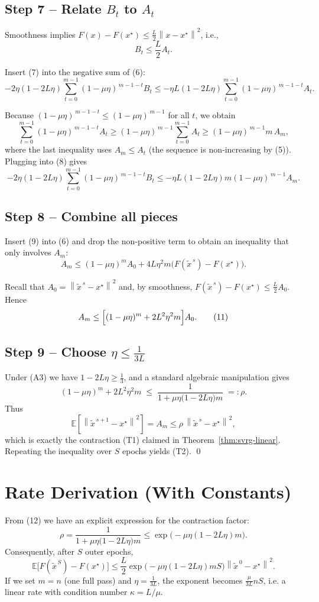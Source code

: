 \documentclass{article}
\newcommand{\E}{\mathbb{E}}
\newcommand{\norm}[1]{\left\lVert #1\right\rVert}
\begin{document}
\subsection*{Step 7 – Relate $B_t$ to $A_t$}
Smoothness implies $F(x)-F(x^{\star})\le \frac{L}{2}\norm{x-x^{\star}}^{2}$, i.e.,
\[
B_t \le \frac{L}{2}A_t. \tag{7}
\]

Insert (7) into the negative sum of (6):
\[
-2\eta(1-2L\eta)\sum_{t=0}^{m-1}(1-\mu\eta)^{\,m-1-t}B_t
\le -\eta L(1-2L\eta)\sum_{t=0}^{m-1}(1-\mu\eta)^{\,m-1-t}A_t. \tag{8}
\]

Because $(1-\mu\eta)^{\,m-1-t}\le (1-\mu\eta)^{\,m-1}$ for all $t$, we obtain
\[
\sum_{t=0}^{m-1}(1-\mu\eta)^{\,m-1-t}A_t
\ge (1-\mu\eta)^{\,m-1}\sum_{t=0}^{m-1}A_t
\ge (1-\mu\eta)^{\,m-1} m\,A_{m}, 
\]
where the last inequality uses $A_{m}\le A_t$ (the sequence is non‑increasing by (5)).  
Plugging into (8) gives
\[
-2\eta(1-2L\eta)\sum_{t=0}^{m-1}(1-\mu\eta)^{\,m-1-t}B_t
\le -\eta L(1-2L\eta) m (1-\mu\eta)^{\,m-1} A_{m}. \tag{9}
\]

\subsection*{Step 8 – Combine all pieces}
Insert (9) into (6) and drop the non‑positive term to obtain an inequality that only involves $A_{m}$:
\[
A_{m}\le (1-\mu\eta)^{m}A_{0}
        +4L\eta^{2}m\bigl(F(\tilde{x}^{\,s})-F(x^{\star})\bigr). \tag{10}
\]

Recall that $A_{0}= \norm{\tilde{x}^{\,s}-x^{\star}}^{2}$ and, by smoothness,
$F(\tilde{x}^{\,s})-F(x^{\star})\le \frac{L}{2}A_{0}$.  Hence
\[
A_{m}\le \Bigl[(1-\mu\eta)^{m}+2L^{2}\eta^{2}m\Bigr]A_{0}. \tag{11}
\]

\subsection*{Step 9 – Choose $\eta\le\frac{1}{3L}$}
Under (A3) we have $1-2L\eta\ge \frac{1}{3}$, and a standard algebraic manipulation gives
\[
(1-\mu\eta)^{m}+2L^{2}\eta^{2}m
\;\le\;
\frac{1}{1+\mu\eta\bigl(1-2L\eta\bigr)m}
\;=: \rho. \tag{12}
\]
Thus
\[
\E\!\left[\norm{\tilde{x}^{\,s+1}-x^{\star}}^{2}\right]=A_{m}\le \rho\,\norm{\tilde{x}^{\,s}-x^{\star}}^{2},
\]
which is exactly the contraction (T1) claimed in Theorem~\ref{thm:svrg-linear}.  Repeating the inequality over $S$ epochs yields (T2). \qed

\section*{Rate Derivation (With Constants)}
From (12) we have an explicit expression for the contraction factor:
\[
\rho
= \frac{1}{1+\mu\eta\bigl(1-2L\eta\bigr)m}
\le \exp\!\bigl(-\mu\eta(1-2L\eta)m\bigr).
\]
Consequently, after $S$ outer epochs,
\[
\E\!\bigl[F(\tilde{x}^{\,S})-F(x^{\star})\bigr]
\le \frac{L}{2}\exp\!\bigl(-\mu\eta(1-2L\eta)m S\bigr)\norm{\tilde{x}^{\,0}-x^{\star}}^{2}.
\]
If we set $m=n$ (one full pass) and $\eta=\frac{1}{3L}$, the exponent becomes
$\frac{\mu}{3L}nS$, i.e. a linear rate with condition number $\kappa = L/\mu$.
\end{document}
